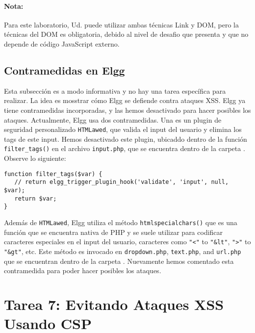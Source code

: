 \paragraph{Nota:} Para este laboratorio, Ud. puede utilizar ambas técnicas Link y DOM, pero la técnicas del DOM es obligatoria, debido al nivel de desafio que presenta y que no depende de código JavaScript externo.



\subsection{Contramedidas en Elgg}

Esta subsección es a modo informativa y no hay una tarea específica para realizar.
La idea es mosstrar cómo Elgg se defiende contra ataques XSS.
Elgg ya tiene contramedidas incorporadas, y
las hemos desactivado para hacer posibles los ataques. Actualmente, Elgg usa dos contramedidas.
Una es un plugin de seguridad personalizado \texttt{HTMLawed},
que valida el input del usuario y elimina los tags de este input.
Hemos desactivado este plugin, 
ubicaddo dentro de la función \texttt{filter\_tags()}
en el archivo \texttt{input.php}, que se encuentra dentro de la carpeta
. Observe lo siguiente:

\begin{lstlisting}
function filter_tags($var) {
   // return elgg_trigger_plugin_hook('validate', 'input', null, $var);
   return $var;
}
\end{lstlisting}
 
Además de {\tt HTMLawed}, Elgg utiliza el método \texttt{htmlspecialchars()} que es una función que se encuentra nativa de PHP y se suele utilizar para codificar caracteres especiales en el input del usuario, caracteres como {\tt "<"} to {\tt "\&lt"}, {\tt ">"} to {\tt "\&gt"}, etc.
Este método es invocado en \texttt{dropdown.php}, \texttt{text.php}, 
and \texttt{url.php} que se encuentran dentro de la carpeta .
Nuevamente hemos comentado esta contramedida para poder hacer posibles los ataques.

\section{Tarea 7: Evitando Ataques XSS Usando CSP}

